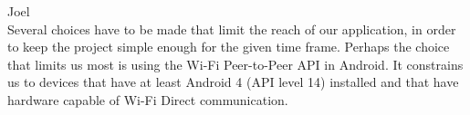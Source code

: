 Joel\\
		Several choices have to be made that limit the reach of our application, in order to keep the project simple enough for the given time frame. Perhaps the choice that limits us most is using the Wi-Fi Peer-to-Peer API in Android. It constrains us to devices that have at least Android 4 (API level 14) installed and that have hardware capable of Wi-Fi Direct communication.\cite{APIGuides}
